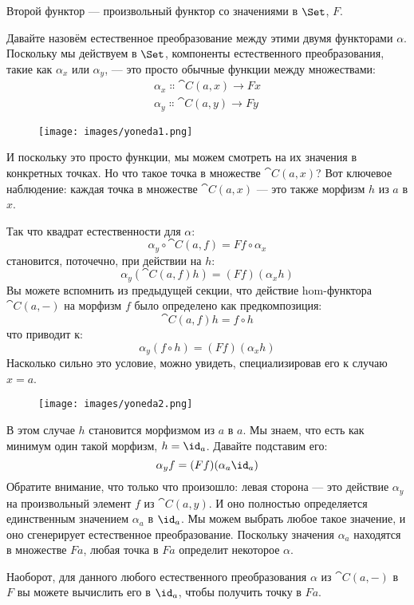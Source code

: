 Второй функтор --- произвольный функтор со значениями в $\Set$,
$F$.

Давайте назовём естественное преобразование между этими двумя функторами
$\alpha$. Поскольку мы действуем в $\Set$, компоненты
естественного преобразования, такие как $\alpha_x$ или $\alpha_y$, --- это просто
обычные функции между множествами:
\begin{gather*}
  \alpha_x \Colon \cat{C}(a, x) \to F x \\
  \alpha_y \Colon \cat{C}(a, y) \to F y
\end{gather*}

\begin{figure}[H]
  \centering
  \texttt{[image: images/yoneda1.png]}
\end{figure}

\noindent
И поскольку это просто функции, мы можем смотреть на их значения в
конкретных точках. Но что такое точка в множестве $\cat{C}(a, x)$? Вот
ключевое наблюдение: каждая точка в множестве $\cat{C}(a, x)$ --- это также
морфизм $h$ из $a$ в $x$.

Так что квадрат естественности для $\alpha$:
\[\alpha_y \circ \cat{C}(a, f) = F f \circ \alpha_x\]
становится, поточечно, при действии на $h$:
\[\alpha_y (\cat{C}(a, f) h) = (F f) (\alpha_x h)\]
Вы можете вспомнить из предыдущей секции, что действие
hom-функтора $\cat{C}(a,-)$ на морфизм $f$ было определено как
предкомпозиция:
\[\cat{C}(a, f) h = f \circ h\]
что приводит к:
\[\alpha_y (f \circ h) = (F f) (\alpha_x h)\]
Насколько сильно это условие, можно увидеть, специализировав его к
случаю $x = a$.

\begin{figure}[H]
  \centering
  \texttt{[image: images/yoneda2.png]}
\end{figure}

\noindent
В этом случае $h$ становится морфизмом из $a$ в
$a$. Мы знаем, что есть как минимум один такой морфизм,
$h = \id_a$. Давайте подставим его:
\[\alpha_y f = (F f) (\alpha_a \id_a)\]
Обратите внимание, что только что произошло: левая сторона --- это действие
$\alpha_y$ на произвольный элемент $f$ из $\cat{C}(a, y)$. И
оно полностью определяется единственным значением $\alpha_a$ в
$\id_a$. Мы можем выбрать любое такое значение, и оно сгенерирует естественное
преобразование. Поскольку значения $\alpha_a$ находятся в множестве
$F a$, любая точка в $F a$ определит некоторое $\alpha$.

Наоборот, для данного любого естественного преобразования $\alpha$ из
$\cat{C}(a, -)$ в $F$ вы можете вычислить его в $\id_a$, чтобы
получить точку в $F a$.

